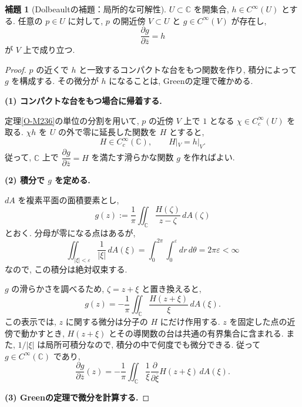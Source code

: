 \documentclass[dvipdfmx,a4paper,11pt]{article} %
\newcommand{\C}{\mathbb{C}}
\theoremstyle{definition}
\numberwithin{equation}{section}
\newtheorem{lem}[thm]{補題}
\begin{document}
\begin{lem}[Dolbeaultの補題：局所的な可解性]\label{O-M239}
$U\subset\C$ を開集合, $h\in C^\infty(U)$ とする.
任意の $p\in U$ に対して, 
$p$ の開近傍 $V\subset U$ と $g\in C^\infty(V)$ が存在し, 
\[
\frac{\partial g}{\partial\overline z}=h
\]
が $V$ 上で成り立つ.
\end{lem}
\begin{proof}
$p$ の近くで $h$ と一致するコンパクトな台をもつ関数を作り,
積分によって $g$ を構成する.
その微分が $h$ になることは, Greenの定理で確かめる.

\medskip
\noindent
\textbf{(1) コンパクトな台をもつ場合に帰着する.}

定理\ref{O-M236}の単位の分割を用いて,
$p$ の近傍 $V$ 上で $1$ となる
$\chi\in C_c^\infty(U)$ を取る.
$\chi h$ を $U$ の外で零に延長した関数を $H$ とすると,
\[
H\in C_c^\infty(\C),\qquad H|_V=h|_V.
\]
従って, $\C$ 上で
$\dfrac{\partial g}{\partial\overline z}=H$
を満たす滑らかな関数 $g$ を作ればよい.

\medskip
\noindent
\textbf{(2) 積分で $g$ を定める.}

$dA$ を複素平面の面積要素とし,
\[
g(z):=\frac1\pi\iint_{\C}
\frac{H(\zeta)}{z-\zeta}\,dA(\zeta)
\]
とおく.
分母が零になる点はあるが,
\[
\iint_{|\xi|<\varepsilon}\frac1{|\xi|}\,dA(\xi)
=\int_0^{2\pi}\int_0^\varepsilon dr\,d\theta
=2\pi\varepsilon<\infty
\]
なので, この積分は絶対収束する.

$g$ の滑らかさを調べるため, $\zeta=z+\xi$ と置き換えると,
\[
g(z)=-\frac1\pi\iint_{\C}\frac{H(z+\xi)}{\xi}\,dA(\xi).
\]
この表示では, $z$ に関する微分は分子の $H$ にだけ作用する.
$z$ を固定した点の近傍で動かすとき,
$H(z+\xi)$ とその導関数の台は共通の有界集合に含まれる.
また, $1/|\xi|$ は局所可積分なので,
積分の中で何度でも微分できる.
従って $g\in C^\infty(\C)$ であり,
\[
\frac{\partial g}{\partial\overline z}(z)
=-\frac1\pi\iint_{\C}
\frac1{\xi}\frac{\partial}{\partial\overline\xi}H(z+\xi)\,dA(\xi).
\]

\medskip
\noindent
\textbf{(3) Greenの定理で微分を計算する.}


\end{proof}
\end{document}
